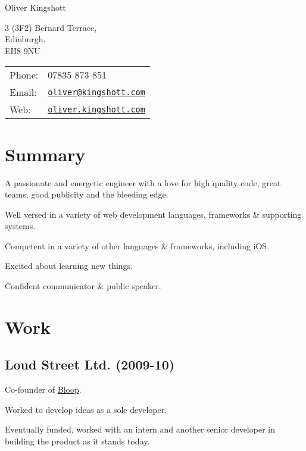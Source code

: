 \documentclass[a4paper]{article}
\def\name{Oliver Kingshott}
\renewenvironment{itemize}{
  \begin{list}{}{
    \setlength{\leftmargin}{1.5em}
  }
}{
  \end{list}
}
\begin{document}
{\huge \name}

\vspace{0.25in}

\begin{minipage}{0.45\linewidth}
  3 (3F2) Bernard Terrace, \\
  Edinburgh. \\
  EH8 9NU
\end{minipage}
\begin{minipage}{0.45\linewidth}
  \begin{tabular}{ll}
    Phone: & 07835 873 851 \\
    Email: & \href{mailto:oliver@kingshott.com}{\tt oliver@kingshott.com} \\
    Web: & \href{http://oliver.kingshott.com/}{\tt oliver.kingshott.com} \\
  \end{tabular}
\end{minipage}

\section*{Summary}
\begin{itemize}
\item A passionate and energetic engineer with a love for high quality code, great teams, good publicity and the bleeding edge.
\item Well versed in a variety of web development languages, frameworks \& supporting systems.
\item Competent in a variety of other languages \& frameworks, including iOS.
\item Excited about learning new things.
\item Confident communicator \& public speaker.
\end{itemize}

\section*{Work}

\subsection*{Loud Street Ltd. (2009-10)}
\begin{itemize}
  \item Co-founder of \href{http://bloop.co}{Bloop}.
  \item Worked to develop ideas as a sole developer.
  \item Eventually funded, worked with an intern and another senior developer in building the product as it stands today.
\end{itemize}
\end{document}
